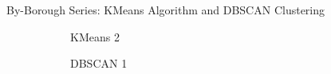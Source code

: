 \documentclass[12pt]{beamer}
\begin{document}
\begin{frame}{By-Borough Series: KMeans Algorithm and DBSCAN Clustering}
\begin{figure}
\begin{subfigure}{0.20\textwidth}
{                    }
                    \caption{KMeans 2}
                \end{subfigure}
                \begin{subfigure}{0.20\textwidth}
                    \caption{DBSCAN 1}
                \end{subfigure}
                \begin{subfigure}{0.20\textwidth}
\end{subfigure}
\end{figure}
\end{frame}
\end{document}
